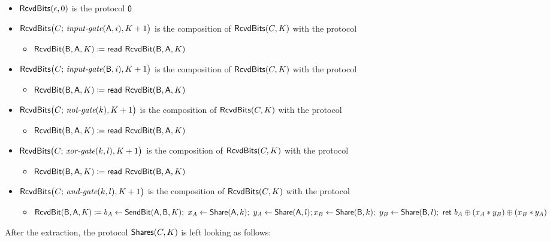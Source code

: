 \begin{itemize}
\item $\mathsf{RcvdBits}(\epsilon,0)$ is the protocol $\mathsf{0}$

\item $\mathsf{RcvdBits}\big(C; \, \textit{input-gate}(\mathsf{A},i),K+1\big)$ is the composition of $\mathsf{RcvdBits}(C,K)$ with the protocol
\begin{itemize}
\item $\mathsf{RcvdBit}(\mathsf{B},\mathsf{A},K) \coloneqq \mathsf{read} \ \mathsf{RcvdBit}(\mathsf{B},\mathsf{A},K)$
\end{itemize}

\item $\mathsf{RcvdBits}\big(C; \, \textit{input-gate}(\mathsf{B},i),K+1\big)$ is the composition of $\mathsf{RcvdBits}(C,K)$ with the protocol
\begin{itemize}
\item $\mathsf{RcvdBit}(\mathsf{B},\mathsf{A},K) \coloneqq \mathsf{read} \ \mathsf{RcvdBit}(\mathsf{B},\mathsf{A},K)$
\end{itemize}

\item $\mathsf{RcvdBits}\big(C; \, \textit{not-gate}(k),K+1\big)$ is the composition of $\mathsf{RcvdBits}(C,K)$ with the protocol
\begin{itemize}
\item $\mathsf{RcvdBit}(\mathsf{B},\mathsf{A},K) \coloneqq \mathsf{read} \ \mathsf{RcvdBit}(\mathsf{B},\mathsf{A},K)$
\end{itemize}

\item $\mathsf{RcvdBits}\big(C; \, \textit{xor-gate}(k,l),K+1\big)$ is the composition of $\mathsf{RcvdBits}(C,K)$ with the protocol
\begin{itemize}
\item $\mathsf{RcvdBit}(\mathsf{B},\mathsf{A},K) \coloneqq \mathsf{read} \ \mathsf{RcvdBit}(\mathsf{B},\mathsf{A},K)$
\end{itemize}

\item $\mathsf{RcvdBits}\big(C; \, \textit{and-gate}(k,l),K+1\big)$ is the composition of $\mathsf{RcvdBits}(C,K)$ with the protocol
\begin{itemize}
\item $\mathsf{RcvdBit}(\mathsf{B},\mathsf{A},K) \coloneqq b_A \leftarrow \mathsf{SendBit}(\mathsf{A},\mathsf{B},K); \ x_A \leftarrow \mathsf{Share}(\mathsf{A},k); \ y_A \leftarrow \mathsf{Share}(\mathsf{A},l); \\ x_B \leftarrow \mathsf{Share}(\mathsf{B},k); \ y_B \leftarrow \mathsf{Share}(\mathsf{B},l); \ \mathsf{ret} \ b_A \oplus (x_A * y_B) \oplus (x_B * y_A)$
\end{itemize}
\end{itemize}

\noindent After the extraction, the protocol $\mathsf{Shares}(C,K)$ is left looking as follows:

